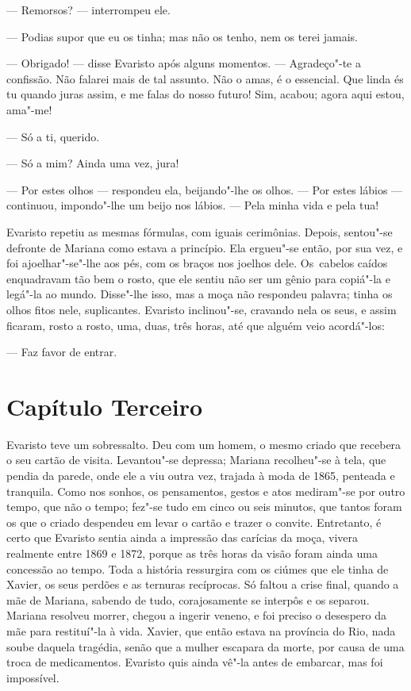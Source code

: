 \begin{linenumbers}
--- Remorsos? --- interrompeu ele.

--- Podias supor que eu os tinha; mas não os tenho, nem os terei jamais.

--- Obrigado! --- disse Evaristo após alguns momentos. --- Agradeço"-te a
confissão. Não falarei mais de tal assunto. Não o amas, é o essencial.
Que linda és tu quando juras assim, e me falas do nosso futuro! Sim,
acabou; agora aqui estou, ama"-me!

--- Só a ti, querido.

--- Só a mim? Ainda uma vez, jura!

--- Por estes olhos --- respondeu ela, beijando"-lhe os olhos. --- Por estes
lábios --- continuou, impondo"-lhe um beijo nos lábios. --- Pela minha vida
e pela tua!

Evaristo repetiu as mesmas fórmulas, com iguais cerimônias. Depois,
sentou"-se defronte de Mariana como estava a princípio. Ela ergueu"-se
então, por sua vez, e foi ajoelhar"-se"-lhe aos pés, com os braços nos
joelhos dele. Os~cabelos caídos enquadravam tão bem o rosto, que ele
sentiu não ser um gênio para copiá"-la e legá"-la ao mundo. Disse"-lhe
isso, mas a moça não respondeu palavra; tinha os olhos fitos nele,
suplicantes. Evaristo inclinou"-se, cravando nela os seus, e assim
ficaram, rosto a rosto, uma, duas, três horas, até que alguém veio
acordá"-los:

--- Faz favor de entrar.

\section{Capítulo Terceiro}

Evaristo teve um sobressalto. Deu com um homem, o mesmo criado que
recebera o seu cartão de visita. Levantou"-se depressa; Mariana
recolheu"-se à tela, que pendia da parede, onde ele a viu outra vez,
trajada à moda de 1865, penteada e tranquila. Como nos sonhos, os
pensamentos, gestos e atos mediram"-se por outro tempo, que não o tempo;
fez"-se tudo em cinco ou seis minutos, que tantos foram os que o criado
despendeu em levar o cartão e trazer o convite. Entretanto, é certo que
Evaristo sentia ainda a impressão das carícias da moça, vivera realmente
entre 1869 e 1872, porque as três horas da visão foram ainda uma
concessão ao tempo. Toda a história ressurgira com os ciúmes que ele
tinha de Xavier, os seus perdões e as ternuras recíprocas. Só faltou a
crise final, quando a mãe de Mariana, sabendo de tudo, corajosamente se
interpôs e os separou. Mariana resolveu morrer, chegou a ingerir veneno,
e foi preciso o desespero da mãe para restituí"-la à vida. Xavier, que
então estava na província do Rio, nada soube daquela tragédia, senão que
a mulher escapara da morte, por causa de uma troca de medicamentos.
Evaristo quis ainda vê"-la antes de embarcar, mas foi impossível.


\end{linenumbers}
